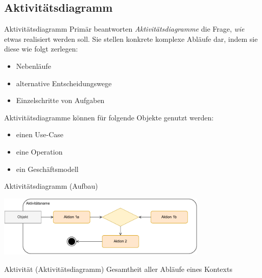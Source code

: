 \subsection{Aktivitätsdiagramm}

\begin{defi}{Aktivitätsdiagramm}
    Primär beantworten \emph{Aktivitätsdiagramme} die Frage, \emph{wie} etwas realisiert werden soll.
    Sie stellen konkrete komplexe Abläufe dar, indem sie diese wie folgt zerlegen:
    \begin{itemize}
        \item Nebenläufe
        \item alternative Entscheidungswege
        \item Einzelschritte von Aufgaben
    \end{itemize}

    Aktivitätsdiagramme können für folgende Objekte genutzt werden:
    \begin{itemize}
        \item einen Use-Case
        \item eine Operation
        \item ein Geschäftsmodell
    \end{itemize}
\end{defi}

\begin{defi}{Aktivitätsdiagramm (Aufbau)}
    \begin{center}
        \includegraphics[width=0.75\textwidth]{includes/figures/defi_diagrams_activity_intro.pdf}
    \end{center}
\end{defi}

\begin{defi}{Aktivität (Aktivitätsdiagramm)}
    Gesamtheit aller Abläufe eines Kontexts
\end{defi}

